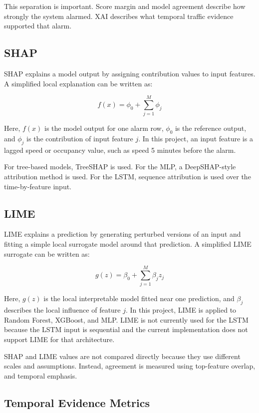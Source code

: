 \documentclass[10pt,a4paper]{article}
\begin{document}
	This separation is important. Score margin and model agreement describe how strongly the system alarmed. XAI describes what temporal traffic evidence supported that alarm.
	
	\subsection{SHAP}
	
	SHAP \cite{shap} explains a model output by assigning contribution values to input features. A simplified local explanation can be written as:
	
	\[
	f(x) = \phi_0 + \sum_{j=1}^{M} \phi_j
	\]
	
	Here, \(f(x)\) is the model output for one alarm row, \(\phi_0\) is the reference output, and \(\phi_j\) is the contribution of input feature \(j\). In this project, an input feature is a lagged speed or occupancy value, such as speed 5 minutes before the alarm.
	
	For tree-based models, TreeSHAP is used. For the MLP, a DeepSHAP-style attribution method is used. For the LSTM, sequence attribution is used over the time-by-feature input.
	
	\subsection{LIME}
	
	LIME \cite{lime} explains a prediction by generating perturbed versions of an input and fitting a simple local surrogate model around that prediction. A simplified LIME surrogate can be written as:
	
	\[
	g(z) = \beta_0 + \sum_{j=1}^{M} \beta_j z_j
	\]
	
	Here, \(g(z)\) is the local interpretable model fitted near one prediction, and \(\beta_j\) describes the local influence of feature \(j\). In this project, LIME is applied to Random Forest, XGBoost, and MLP. LIME is not currently used for the LSTM because the LSTM input is sequential and the current implementation does not support LIME for that architecture.
	
	SHAP and LIME values are not compared directly because they use different scales and assumptions. Instead, agreement is measured using top-feature overlap, and temporal emphasis.
	
	
	\subsection{Temporal Evidence Metrics}
	
\end{document}
